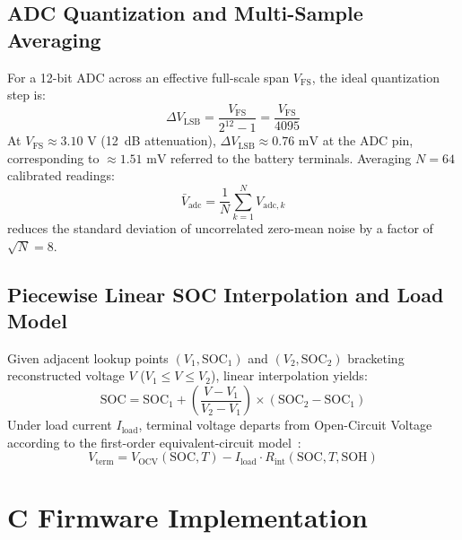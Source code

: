 \documentclass[12pt,a4paper]{article}
\begin{document}
\subsection{ADC Quantization and Multi-Sample Averaging}
For a 12-bit ADC across an effective full-scale span $V_{\text{FS}}$, the ideal quantization step is:
\begin{equation}
    \Delta V_{\text{LSB}} = \frac{V_{\text{FS}}}{2^{12} - 1} = \frac{V_{\text{FS}}}{4095}
    \label{eq:adc_lsb}
\end{equation}
At $V_{\text{FS}} \approx 3.10\text{ V}$ (12~dB attenuation), $\Delta V_{\text{LSB}} \approx 0.76\text{ mV}$ at the ADC pin, corresponding to $\approx 1.51\text{ mV}$ referred to the battery terminals. Averaging $N = 64$ calibrated readings:
\begin{equation}
    \bar{V}_{\text{adc}} = \frac{1}{N} \sum_{k=1}^{N} V_{\text{adc},k}
    \label{eq:adc_avg}
\end{equation}
reduces the standard deviation of uncorrelated zero-mean noise by a factor of $\sqrt{N} = 8$.

\subsection{Piecewise Linear SOC Interpolation and Load Model}
Given adjacent lookup points $(V_1, \text{SOC}_1)$ and $(V_2, \text{SOC}_2)$ bracketing reconstructed voltage $V$ ($V_1 \le V \le V_2$), linear interpolation yields:
\begin{equation}
    \text{SOC} = \text{SOC}_1 + \left(\frac{V - V_1}{V_2 - V_1}\right) \times (\text{SOC}_2 - \text{SOC}_1)
    \label{eq:soc_interp}
\end{equation}
Under load current $I_{\text{load}}$, terminal voltage departs from Open-Circuit Voltage according to the first-order equivalent-circuit model~\cite{plett_bms1}:
\begin{equation}
    V_{\text{term}} = V_{\text{OCV}}(\text{SOC}, T) - I_{\text{load}} \cdot R_{\text{int}}(\text{SOC}, T, \text{SOH})
    \label{eq:vterm}
\end{equation}

\section{C Firmware Implementation}
\label{sec:firmware_impl}
\end{document}
